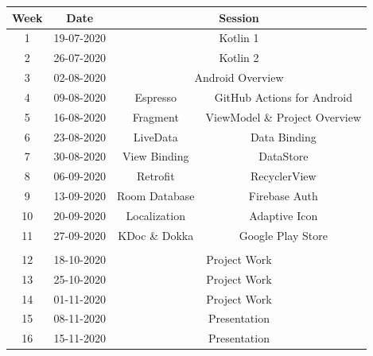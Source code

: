 \documentclass{article}
\begin{document}
\renewcommand{\arraystretch}{1.5}
\begin{tabular}{|c|c|c|c|}
	\hline
	\textbf{Week} & \textbf{Date}     & \multicolumn{2}{c|}{\textbf{Session}}        \\ \hline
	\small 1      & \small 19-07-2020 & \multicolumn{2}{c|}{\small Kotlin 1} \\ \hline
	\small 2      & \small 26-07-2020 & \multicolumn{2}{c|}{\small Kotlin 2} \\ \hline
	\small 3      & \small 02-08-2020 & \multicolumn{2}{c|}{\small Android Overview} \\ \hline
	\small 4      & \small 09-08-2020 & \small Espresso & \small GitHub Actions for Android  \\ \hline
	\small 5      & \small 16-08-2020 & \small Fragment & \small ViewModel \& Project Overview  \\ \hline
	\small 6      & \small 23-08-2020 & \small LiveData & \small Data Binding  \\ \hline
	\small 7      & \small 30-08-2020 & \small View Binding & \small DataStore  \\ \hline
	\small 8      & \small 06-09-2020 & \small Retrofit & \small RecyclerView  \\ \hline
	\small 9      & \small 13-09-2020 & \small Room Database  & \small Firebase Auth  \\ \hline

	\small 10     & \small 20-09-2020 & \small Localization & \small Adaptive Icon   \\ \hline 
	\small 11     & \small 27-09-2020 & \small KDoc \& Dokka & \small Google Play Store  \\ \hline
	\rowcolor{yellow} \multicolumn{4}{|c|}{\small Mid Term Break}                    \\ \hline
	\small 12     & \small 18-10-2020 & \multicolumn{2}{c|}{\small Project Work}     \\ \hline
	\small 13     & \small 25-10-2020 & \multicolumn{2}{c|}{\small Project Work}     \\ \hline
	\small 14     & \small 01-11-2020 & \multicolumn{2}{c|}{\small Project Work}     \\ \hline
	\small 15     & \small 08-11-2020 & \multicolumn{2}{c|}{\small Presentation}     \\ \hline
	\small 16     & \small 15-11-2020 & \multicolumn{2}{c|}{\small Presentation}     \\ \hline
\end{tabular}
\end{document}
